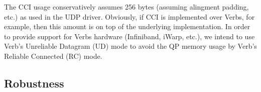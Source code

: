 The CCI usage conservatively assumes 256 bytes (assuming alingment padding,
etc.) as used in the UDP driver. Obviously, if CCI is implemented over Verbs,
for example, then this amount is on top of the underlying implementation. In
order to provide support for Verbs hardware (Infiniband, iWarp, etc.), we intend
to use Verb's Unreliable Datagram (UD) mode to avoid the QP memory usage by
Verb's Reliable Connected (RC) mode.


\subsection{Robustness}

